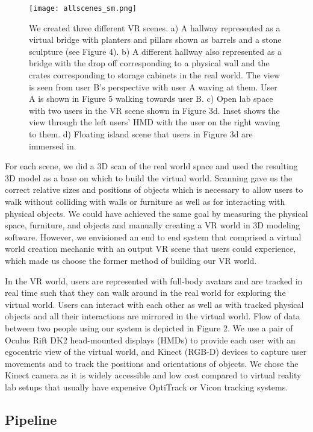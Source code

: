 \documentclass{sigchi}
\begin{document}
\begin{figure}[!t]
\centering
\texttt{[image: allscenes\_sm.png]}
\caption{We created three different VR scenes. a) A hallway represented as a virtual bridge with planters and pillars shown as barrels and a stone sculpture (see Figure 4). b) A different hallway also represented as a bridge with the drop off corresponding to a physical wall and the crates corresponding to storage cabinets in the real world. The view is seen from user B's perspective with user A waving at them. User A is shown in Figure 5 walking towards user B. c) Open lab space with two users in the VR scene shown in Figure 3d. Inset shows the view through the left users' HMD with the user on the right waving to them. d) Floating island scene that users in Figure 3d are immersed in. }
\label{fig:bridge}
\end{figure}




For each scene, we did a 3D scan of the real world space and used the resulting 3D model as a base on which to build the virtual world. Scanning gave us the correct relative sizes and positions of objects which is necessary to allow users to walk without colliding with walls or furniture as well as for interacting with physical objects. We could have achieved the same goal by measuring the physical space, furniture, and objects and manually creating a VR world in 3D modeling software. However, we envisioned an end to end system that comprised a virtual world creation mechanic with an output VR scene that users could experience, which made us choose the former method of building our VR world. 


In the VR world, users are represented with full-body avatars and are tracked in real time such that they can walk around in the real world for exploring the virtual world. Users can interact with each other as well as with tracked physical objects and all their interactions are mirrored in the virtual world. Flow of data between two people using our system is depicted in Figure 2. We use a pair of Oculus Rift DK2 head-mounted displays (HMDs) to provide each user with an egocentric view of the virtual world, and Kinect (RGB-D) devices to capture user movements and to track the positions and orientations of objects.  We chose the Kinect camera as it is widely accessible and low cost compared to virtual reality lab setups that usually have expensive OptiTrack or Vicon tracking systems. 


\subsection{Pipeline}
\end{document}
